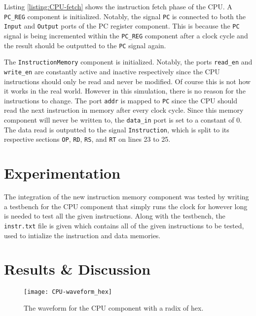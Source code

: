\documentclass[11pt]{report}
\begin{document}
\newpage


Listing \ref{listing:CPU-fetch} shows the instruction fetch phase of the CPU. A \verb|PC_REG|
component is initialized. Notably, the signal \verb|PC| is connected to both the \verb|Input| and
\verb|Output| ports of the PC register component. This is because the \verb|PC| signal is being
incremented within the \verb|PC_REG| component after a clock cycle and the result should be
outputted to the \verb|PC| signal again.

The \verb|InstructionMemory| component is initialized. Notably, the ports \verb|read_en| and
\verb|write_en| are constantly active and inactive respectively since the CPU instructions should
only be read and never be modified. Of course this is not how it works in the real world. However in
this simulation, there is no reason for the instructions to change. The port \verb|addr| is mapped
to \verb|PC| since the CPU should read the next instruction in memory after every clock cycle. Since
this memory component will never be written to, the \verb|data_in| port is set to a constant of $0$.
The data read is outputted to the signal \verb|Instruction|, which is split to its respective
sections \verb|OP|, \verb|RD|, \verb|RS|, and \verb|RT| on lines 23 to 25.

\section*{Experimentation}
The integration of the new instruction memory component was tested by writing a testbench for the
CPU component that simply runs the clock for however long is needed to test all the given
instructions. Along with the testbench, the \verb|instr.txt| file is given which contains all of the
given instructions to be tested, used to intialize the instruction and data memories.

\section*{Results \& Discussion}
\begin{figure}[h!]
    \centering
    \texttt{[image: CPU-waveform\_hex]}
    \caption{The waveform for the CPU component with a radix of hex.}
    \label{fig:CPU-waveform_hex}
\end{figure}
\end{document}
